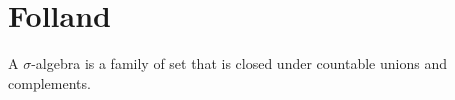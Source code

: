 \chapter{Folland}
\begin{defn}
    A $\sigma$-algebra is a family of set that is closed under countable unions and complements.
\end{defn}
